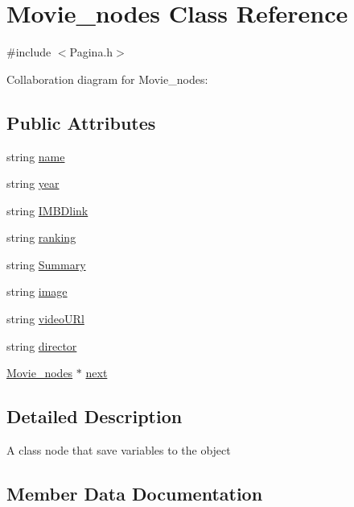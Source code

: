 \hypertarget{classMovie__nodes}{}\section{Movie\+\_\+nodes Class Reference}
\label{classMovie__nodes}


{\ttfamily \#include $<$Pagina.\+h$>$}



Collaboration diagram for Movie\+\_\+nodes\+:
\subsection*{Public Attributes}
\begin{DoxyCompactItemize}
\item 
string \hyperlink{classMovie__nodes_a4c163d6e132a771181fbbda75c86daa9}{name}
\item 
string \hyperlink{classMovie__nodes_a3f13e928ef69696af7b419bb16cd1f15}{year}
\item 
string \hyperlink{classMovie__nodes_ac4c6c5723294e3f05387a2ac31c68cdf}{I\+M\+B\+Dlink}
\item 
string \hyperlink{classMovie__nodes_a973ce5054c9b339ff7524f321e536907}{ranking}
\item 
string \hyperlink{classMovie__nodes_a750c539606db10507a051bb8015c7e9f}{Summary}
\item 
string \hyperlink{classMovie__nodes_ac67e06cbb47f1caa0b8656fb7160c6ea}{image}
\item 
string \hyperlink{classMovie__nodes_afe4615779808359a974838d85ba3c70e}{video\+U\+Rl}
\item 
string \hyperlink{classMovie__nodes_ad79141f927725dd8cf352ceb1e4a68af}{director}
\item 
\hyperlink{classMovie__nodes}{Movie\+\_\+nodes} $\ast$ \hyperlink{classMovie__nodes_a6b336921094b1c3bfa9ffbcab56a2552}{next}
\end{DoxyCompactItemize}


\subsection{Detailed Description}
A class node that save variables to the object 

\subsection{Member Data Documentation}
\mbox{\label{classMovie__nodes_ad79141f927725dd8cf352ceb1e4a68af}} 
